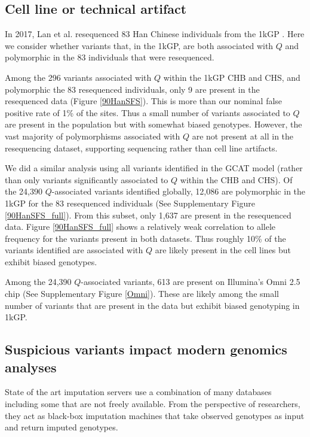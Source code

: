\documentclass[9pt,lineno]{elife}
\begin{document}
\subsection{Cell line or technical artifact}

In 2017, Lan et al. resequenced 83 Han Chinese individuals from the 1kGP \citep{Lan2017}. 
Here we consider whether variants that, in the 1kGP, are both associated with $Q$ and polymorphic in the 83 individuals that were resequenced.

Among the 296 variants associated with $Q$ within the 1kGP CHB and CHS, and polymorphic the 83 resequenced individuals, only 9 are present in the resequenced data (Figure \ref{90HanSFS}). 
This is more than our nominal false positive rate of 1\% of the sites. Thus a small number of variants associated to $Q$ are present in the population but with somewhat biased genotypes. 
However, the vast majority of polymorphisms associated with $Q$ are not present at all in the resequencing dataset, supporting sequencing rather than cell line artifacts.


We did a similar analysis using all variants identified in the GCAT model (rather than only variants significantly associated to $Q$ within the CHB and CHS). 
Of the 24,390 $Q$-associated variants identified globally, 12,086 are polymorphic in the 1kGP for the 83 resequenced individuals  (See Supplementary Figure \ref{90HanSFS_full}).
From this subset, only 1,637 are present in the resequenced data.
Figure \ref{90HanSFS_full} shows a relatively weak correlation to allele frequency for the variants present in both datasets.
Thus roughly 10\% of the variants identified are associated with $Q$ are likely present in the cell lines but exhibit biased genotypes.


Among the 24,390 $Q$-associated variants, 613 are present on Illumina's Omni 2.5 chip (See Supplementary Figure \ref{Omni}). 
These are likely among the small number of variants that are present in the data but exhibit biased genotyping in 1kGP. 

\subsection{Suspicious variants impact modern genomics analyses}

State of the art imputation servers use a combination of many databases including some that are not freely available.
From the perspective of researchers, they act as black-box imputation machines that take observed genotypes as input and return imputed genotypes.  
\end{document}
